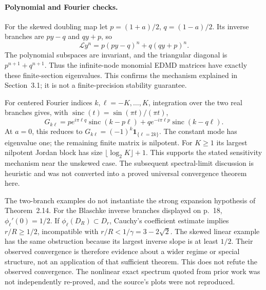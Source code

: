 \documentclass[10pt]{article}
\begin{document}
\paragraph*{Polynomial and Fourier checks.}\mbox{}\par
For the skewed doubling map let \(p=(1+a)/2\), \(q=(1-a)/2\). Its inverse branches are \(py-q\) and \(qy+p\), so \[\mathcal Ly^n=p(py-q)^n+q(qy+p)^n.\] The polynomial subspaces are invariant, and the triangular diagonal is \(p^{n+1}+q^{n+1}\). Thus the infinite-node monomial EDMD matrices have exactly these finite-section eigenvalues. This confirms the mechanism explained in Section 3.1; it is not a finite-precision stability guarantee.\par
For centered Fourier indices \(k,\ell=-K,\ldots,K\), integration over the two real branches gives, with \(\operatorname{sinc}(t)=\sin(\pi t)/(\pi t)\), \[G_{k\ell}
 =p e^{i\pi\ell q}\operatorname{sinc}(k-p\ell)
  +q e^{-i\pi\ell p}\operatorname{sinc}(k-q\ell).\] At \(a=0\), this reduces to \(G_{k\ell}=(-1)^k\mathbf1_{\{\ell=2k\}}\). The constant mode has eigenvalue one; the remaining finite matrix is nilpotent. For \(K\ge1\) its largest nilpotent Jordan block has size \(\lfloor\log_2K\rfloor+1\). This supports the stated sensitivity mechanism near the unskewed case. The subsequent spectral-limit discussion is heuristic and was not converted into a proved universal convergence theorem here.\par
The two-branch examples do not instantiate the strong expansion hypothesis of Theorem 2.14. For the Blaschke inverse branches displayed on p. 18, \(\phi_\ell'(0)=1/2\). If \(\phi_\ell(D_R)\subset D_r\), Cauchy’s coefficient estimate implies \(r/R\ge1/2\), incompatible with \(r/R<1/\gamma=3-2\sqrt2\). The skewed linear example has the same obstruction because its largest inverse slope is at least \(1/2\). Their observed convergence is therefore evidence about a wider regime or special structure, not an application of that sufficient theorem. This does not refute the observed convergence. The nonlinear exact spectrum quoted from prior work was not independently re-proved, and the source’s plots were not reproduced.\par
\end{document}
